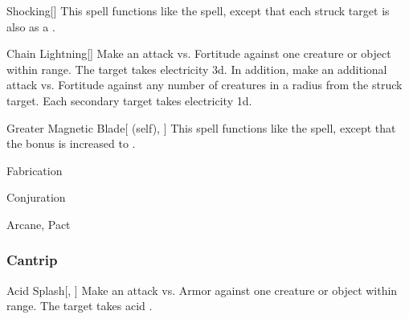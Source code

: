 \lowercase{\hypertarget{spell:Shocking}{}}\label{spell:Shocking}
\begin{apability}[\nth{3}]{\hypertarget{spell:Shocking}{Shocking}}[]
This spell functions like the  spell, except that each struck target is also  as a .
\end{apability}
\vspace{0.25em}



\lowercase{\hypertarget{spell:Chain Lightning}{}}\label{spell:Chain Lightning}
\begin{apability}[\nth{4}]{\hypertarget{spell:Chain Lightning}{Chain Lightning}}[]
Make an attack vs. Fortitude against one creature or object within \rngmed range.
\hit The target takes electricity  \plus3d.
In addition, make an additional attack vs. Fortitude against any number of creatures in a \areamed radius from the struck target.
\hit Each secondary target takes electricity  \plus1d.
\end{apability}
\vspace{0.25em}



\lowercase{\hypertarget{spell:Greater Magnetic Blade}{}}\label{spell:Greater Magnetic Blade}
\begin{attuneability}[\nth{6}]{\hypertarget{spell:Greater Magnetic Blade}{Greater Magnetic Blade}}[ (self), ]
This spell functions like the  spell, except that the bonus is increased to .
\end{attuneability}
\vspace{0.25em}


\newpage
\begin{spellsection}{Fabrication}

\begin{spellheader}
\end{spellheader}


 Conjuration

 Arcane, Pact

\subsubsection{Cantrip}


\begin{freeability}{Acid Splash}[, ]
Make an attack vs. Armor against one creature or object within \rngmed range.
\hit The target takes acid .
\end{freeability}

\end{spellsection}


